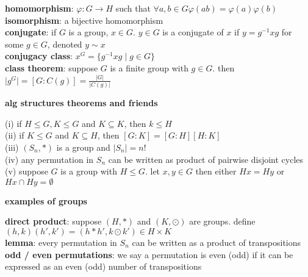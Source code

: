 \documentclass[a4paper]{article}
\begin{document}
\begin{multicols}{2}
\begin{framed}
	\noindent
	\textbf{homomorphism}: $\varphi: G \to H$ such that $\forall a, b \in G \varphi(ab) = \varphi(a)\varphi(b)$\\
	
	\noindent
	\textbf{isomorphism}: a bijective homomorphism\\
	
	\noindent
	\textbf{conjugate}: if $G$ is a group, $x \in G$. $y \in G$ is a conjugate of $x$ if $y = g^{-1}xg$ for some $g \in G$, denoted $y \sim x$\\
	
	\noindent
	\textbf{conjugacy class}: $x^G = \{g^{-1}xg \; \vert \; g \in G\}$\\
	
	\noindent
	\textbf{class theorem}: suppose $G$ is a finite group with $g \in G$. then $\vert g^G \vert = [G : C(g)] = \frac{\vert G \vert}{\vert C(g) \vert}$
\end{framed}

\begin{framed}
	\begin{center}
		\textbf{alg structures theorems and friends}
	\end{center}
	
	\noindent
	(i) if $H \leq G, K \leq G$ and $K \subseteq K$, then $k \leq H$\\
	(ii) if $K \leq G$ and $K \subseteq H$, then $[G:K]=[G:H][H:K]$\\
	(iii) $(S_n, *)$ is a group and $\vert S_n \vert = n!$\\
	(iv) any permutation in $S_n$ can be written as product of pairwise disjoint cycles\\
	(v) suppose $G$ is a group with $H \leq G$. let $x, y \in G$ then either $Hx = Hy$ or $Hx \cap Hy = \emptyset$
\end{framed}

\begin{framed}
	\begin{center}
		\textbf{examples of groups}	
	\end{center}
	
	\noindent
	\textbf{direct product}: suppose $(H, *)$ and $(K, \odot)$ are groups. define $(h, k)(h', k') = (h * h', k \odot k') \in H \times K$\\
	
	\noindent
	\textbf{lemma}: every permutation in $S_n$ can be written as a product of transpositions\\
	
	\noindent
	\textbf{odd / even permutations}: we say a permutation is even (odd) if it can be expressed as an even (odd) number of transpositions\\
	

\end{framed}
\end{multicols}
\end{document}
